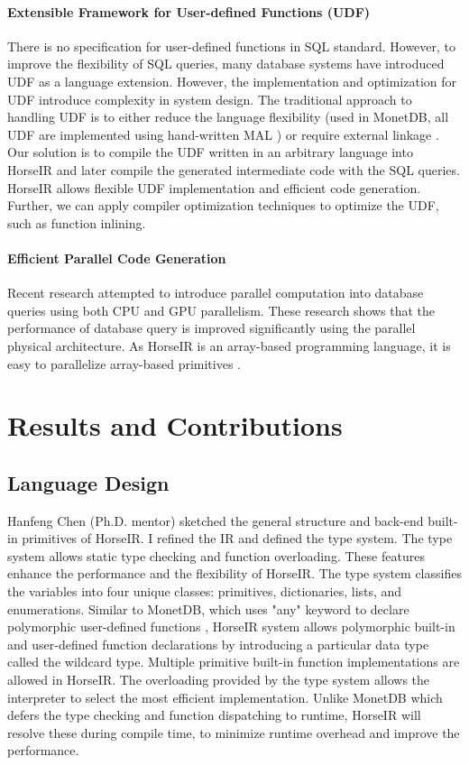 \documentclass[sigplan]{acmart}
\begin{document}
\paragraph{Extensible Framework for User-defined Functions (UDF)} There is no
specification for user-defined functions in SQL standard. However, to improve
the flexibility of SQL queries, many database systems have introduced UDF as a
language extension. However, the implementation and optimization for UDF
introduce complexity in system design. The traditional approach to handling UDF
is to either reduce the language flexibility (used in MonetDB, all UDF are
implemented using hand-written MAL \cite{MALUDF}) or require external linkage
\cite{ExternUDF}. Our solution is to compile the UDF written in an arbitrary
language into HorseIR and later compile the generated intermediate code with
the SQL queries. HorseIR allows flexible UDF implementation and efficient code
generation. Further, we can apply compiler optimization techniques to optimize
the UDF, such as function inlining.

\paragraph{Efficient Parallel Code Generation}
Recent research attempted to introduce parallel computation into database
queries using both CPU\cite{DBLP:conf/sigmod/PolychroniouRR15,
DBLP:conf/sigmod/ZhouR02} and GPU \cite{DBLP:conf/ica3pp/CremerBMM16}
parallelism. These research shows that the performance of database query is
improved significantly using the parallel physical architecture. As HorseIR is
an array-based programming language, it is easy to parallelize array-based
primitives \cite{DBLP:conf/pldi/ImamSLK14}.

\section{Results and Contributions}
\subsection*{Language Design}
Hanfeng Chen (Ph.D. mentor) sketched the general structure and back-end
built-in primitives of HorseIR. I refined the IR and defined the type system.
The type system allows static type checking and function overloading. These
features enhance the performance and the flexibility of HorseIR. The type
system classifies the variables into four unique classes: primitives,
dictionaries, lists, and enumerations. Similar to MonetDB, which uses
"any" keyword to declare polymorphic user-defined functions
\cite{MonetDBPolymorphism}, HorseIR system allows polymorphic built-in and
user-defined function declarations by introducing a particular data type called
the wildcard type. Multiple primitive built-in function implementations are
allowed in HorseIR. The overloading provided by the type system allows the
interpreter to select the most efficient implementation. Unlike MonetDB which
defers the type checking and function dispatching to runtime, HorseIR
will resolve these during compile time, to minimize runtime overhead and
improve the performance.
\end{document}

